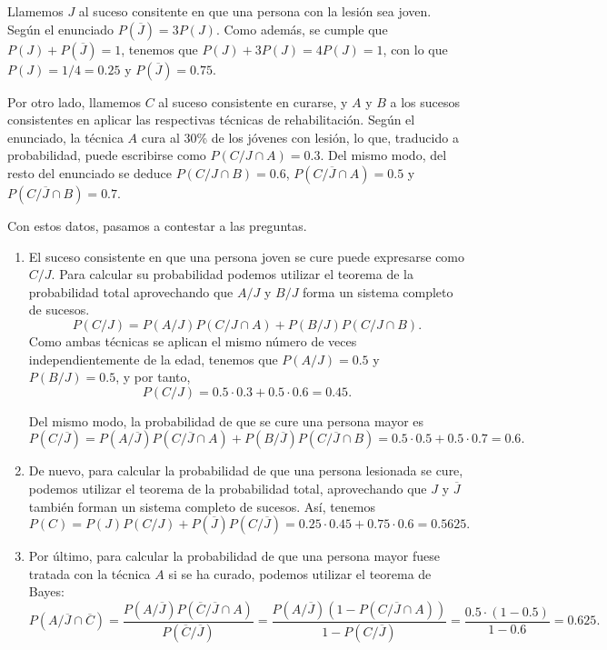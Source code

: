 {Llamemos $J$ al suceso consitente en que una persona con la lesión sea joven. Según el enunciado $P(\overline{J})=3P(J)$. Como además, se
cumple que $P(J)+P(\overline{J})=1$, tenemos que $P(J)+3P(J)=4P(J)=1$, con lo que $P(J)=1/4=0.25$ y $P(\overline{J})=0.75$.

Por otro lado, llamemos $C$ al suceso consistente en curarse, y $A$ y $B$ a los sucesos consistentes en aplicar las respectivas técnicas de
rehabilitación. Según el enunciado, la técnica $A$ cura al 30\% de los jóvenes con lesión, lo que, traducido a probabilidad, puede
escribirse como $P(C/J\cap A)=0.3$. Del mismo modo, del resto del enunciado se deduce $P(C/J\cap B)=0.6$, $P(C/\overline{J}\cap A)=0.5$ y
$P(C/\overline{J}\cap B)=0.7$.

Con estos datos, pasamos a contestar a las preguntas.
\begin{enumerate}
\item El suceso consistente en que una persona joven se cure puede expresarse como $C/J$. Para calcular su probabilidad podemos utilizar el
teorema de la probabilidad total aprovechando que $A/J$ y $B/J$ forma un sistema completo de sucesos.
\[
P(C/J)=P(A/J)P(C/J\cap A)+P(B/J)P(C/J\cap B).
\]
Como ambas técnicas se aplican el mismo número de veces independientemente de la edad, tenemos que $P(A/J)=0.5$ y $P(B/J)=0.5$, y por tanto,
\[
P(C/J)=0.5\cdot 0.3+0.5\cdot 0.6=0.45.
\]

Del mismo modo, la probabilidad de que se cure una persona mayor es
\[
P(C/\overline{J})=P(A/\overline{J})P(C/\overline{J}\cap A)+P(B/\overline{J})P(C/\overline{J}\cap B)=0.5\cdot 0.5+0.5\cdot 0.7=0.6.
\]

\item De nuevo, para calcular la probabilidad de que una persona lesionada se cure, podemos utilizar el teorema de la probabilidad total,
aprovechando que $J$ y $\overline{J}$ también forman un sistema completo de sucesos. Así, tenemos 
\[
P(C)= P(J)P(C/J)+P(\overline{J})P(C/\overline{J})= 0.25\cdot 0.45+0.75\cdot 0.6=0.5625.
\]

\item Por último, para calcular la probabilidad de que una persona mayor fuese tratada con la técnica $A$ si se ha curado, podemos utilizar
el teorema de Bayes:
\[
P(A/\overline{J}\cap \overline{C})=\frac{P(A/\overline{J})P(\overline{C}/\overline{J}\cap A)}{P(\overline{C}/\overline{J})}=
\frac{P(A/\overline{J})(1-P(C/\overline{J}\cap A))}{1-P(C/\overline{J})}=\frac{0.5\cdot(1-0.5)}{1-0.6}= 0.625.
\]
\end{enumerate}
}


